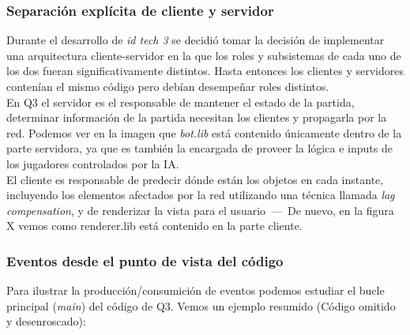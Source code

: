 \documentclass[a4paper,12pt]{report}
\begin{document}
	\subsubsection{Separación explícita de cliente y servidor}
	
	Durante el desarrollo de \textit{id tech 3} se decidió tomar la decisión de implementar una arquitectura cliente-servidor en la que los roles y subsistemas de cada uno de los dos fueran significativamente distintos. Hasta entonces los clientes y servidores contenían el mismo código pero debían desempeñar roles distintos.\\
	
	En Q3 el servidor es el responsable de mantener el estado de la partida, determinar información de la partida necesitan los clientes y propagarla por la red. Podemos ver en la imagen que \textit{bot.lib} está contenido únicamente dentro de la parte servidora, ya que es también la encargada de proveer la lógica e inputs de los jugadores controlados por la IA.\\
	
	El cliente es responsable de predecir dónde están los objetos en cada instante, incluyendo los elementos afectados por la red utilizando una técnica llamada \textit{lag compensation}, y de renderizar la vista para el usuario \,---\, De nuevo, en la figura X vemos como renderer.lib está contenido en la parte cliente.	\cite{architecture}\\
	
	\subsubsection{Eventos desde el punto de vista del código}
	
	Para ilustrar la producción/consumición de eventos podemos estudiar el bucle principal (\textit{main}) del código de Q3. Vemos un ejemplo resumido (Código omitido y desenroscado):
	
\end{document}
